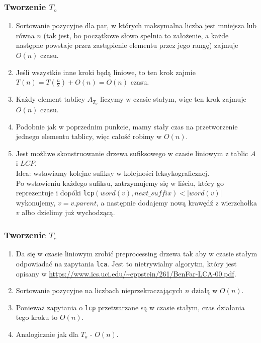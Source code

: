 \subsubsection{Tworzenie $T_o$}
\begin{enumerate}
\item Sortowanie pozycyjne dla par, w których maksymalna liczba jest mniejsza lub równa $n$ (tak jest, bo początkowe słowo spełnia to założenie, a każde następne powstaje przez zastąpienie elementu przez jego rangę) zajmuje $O(n)$ czasu.
\item Jeśli wszystkie inne kroki będą liniowe, to ten krok zajmie $T(n) = T(\frac{n}{2}) + O(n) = O(n)$ czasu.
\item Każdy element tablicy $A_{T_o}$ liczymy w czasie stałym, więc ten krok zajmuje $O(n)$ czasu.
\item Podobnie jak w poprzednim punkcie, mamy stały czas na przetworzenie jednego elementu tablicy, więc całość robimy w $O(n)$.
\item Jest możliwe skonstruowanie drzewa sufiksowego w czasie liniowym z tablic $A$ i $LCP$.\\ Idea: wstawiamy kolejne sufiksy w kolejności leksykograficznej. \\
Po wstawieniu każdego sufiksu, zatrzymujemy się w liściu, który go reprezentuje i dopóki \verb|lcp|$(word(v), next\_suffix) < |word(v)|$ wykonujemy, $v = v.parent$, a następnie dodajemy nową krawędź z wierzchołka $v$ albo dzielimy już wychodzącą.
\end{enumerate}
\subsubsection{Tworzenie $T_e$}
\begin{enumerate}
\item Da się w czasie liniowym zrobić preprocessing drzewa tak aby w czasie stałym odpowiadać na zapytania \verb|lca|. Jest to nietrywialny algorytm, który jest opisany w \url{https://www.ics.uci.edu/~eppstein/261/BenFar-LCA-00.pdf}.
\item Sortowanie pozycyjne na liczbach nieprzekraczających $n$ działą w $O(n)$.
\item Ponieważ zapytania o \verb|lcp| przetwarzane są w czasie stałym, czas działania tego kroku to $O(n)$.
\item Analogicznie jak dla $T_o$ - $O(n)$.
\end{enumerate}
